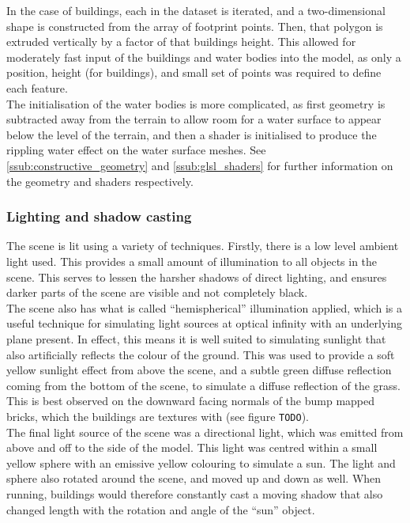             In the case of buildings, each in the dataset is iterated, and a two-dimensional shape is constructed from the array of footprint points.
            Then, that polygon is extruded vertically by a factor of that buildings height.
            This allowed for moderately fast input of the buildings and water bodies into the model, as only a position, height (for buildings), and small set of points was required to define each feature.\\

            The initialisation of the water bodies is more complicated, as first geometry is subtracted away from the terrain to allow room for a water surface to appear below the level of the terrain, and then a shader is initialised to produce the rippling water effect on the water surface meshes. See \ref{ssub:constructive_geometry} and \ref{ssub:glsl_shaders} for further information on the geometry and shaders respectively.


        \subsubsection{Lighting and shadow casting} %
        \label{ssub:lighting_and_shadow_casting}
            The scene is lit using a variety of techniques.
            Firstly, there is a low level ambient light used.
            This provides a small amount of illumination to all objects in the scene.
            This serves to lessen the harsher shadows of direct lighting, and ensures darker parts of the scene are visible and not completely black.\\

            The scene also has what is called ``hemispherical'' illumination applied, which is a useful technique for simulating light sources at optical infinity with an underlying plane present.
            In effect, this means it is well suited to simulating sunlight that also artificially reflects the colour of the ground.
            This was used to provide a soft yellow sunlight effect from above the scene, and a subtle green diffuse reflection coming from the bottom of the scene, to simulate a diffuse reflection of the grass.
            This is best observed on the downward facing normals of the bump mapped bricks, which the buildings are textures with (see figure \texttt{TODO}).\\

            The final light source of the scene was a directional light, which was emitted from above and off to the side of the model.
            This light was centred within a small yellow sphere with an emissive yellow colouring to simulate a sun.
            The light and sphere also rotated around the scene, and moved up and down as well.
            When running, buildings would therefore constantly cast a moving shadow that also changed length with the rotation and angle of the ``sun'' object.

